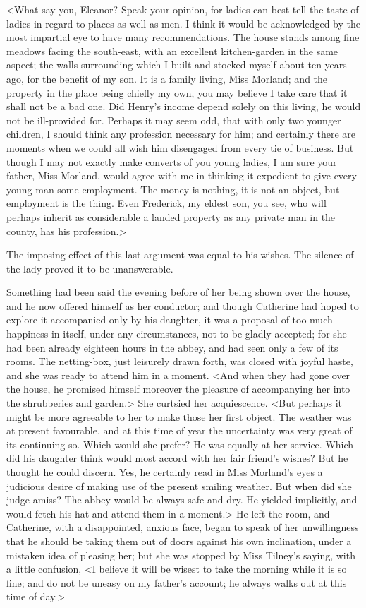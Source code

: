  <What say you, Eleanor? Speak your opinion, for ladies can best tell the taste of ladies in regard to places as well as men. I think it would be acknowledged by the most impartial eye to have many recommendations. The house stands among fine meadows facing the south-east, with an excellent kitchen-garden in the same aspect; the walls surrounding which I built and stocked myself about ten years ago, for the benefit of my son. It is a family living, Miss Morland; and the property in the place being chiefly my own, you may believe I take care that it shall not be a bad one. Did Henry's income depend solely on this living, he would not be ill-provided for. Perhaps it may seem odd, that with only two younger children, I should think any profession necessary for him; and certainly there are moments when we could all wish him disengaged from every tie of business. But though I may not exactly make converts of you young ladies, I am sure your father, Miss Morland, would agree with me in thinking it expedient to give every young man some employment. The money is nothing, it is not an object, but employment is the thing. Even Frederick, my eldest son, you see, who will perhaps inherit as considerable a landed property as any private man in the county, has his profession.> 

 The imposing effect of this last argument was equal to his wishes. The silence of the lady proved it to be unanswerable. 

 Something had been said the evening before of her being shown over the house, and he now offered himself as her conductor; and though Catherine had hoped to explore it accompanied only by his daughter, it was a proposal of too much happiness in itself, under any circumstances, not to be gladly accepted; for she had been already eighteen hours in the abbey, and had seen only a few of its rooms. The netting-box, just leisurely drawn forth, was closed with joyful haste, and she was ready to attend him in a moment. <And when they had gone over the house, he promised himself moreover the pleasure of accompanying her into the shrubberies and garden.> She curtsied her acquiescence. <But perhaps it might be more agreeable to her to make those her first object. The weather was at present favourable, and at this time of year the uncertainty was very great of its continuing so. Which would she prefer? He was equally at her service. Which did his daughter think would most accord with her fair friend's wishes? But he thought he could discern. Yes, he certainly read in Miss Morland's eyes a judicious desire of making use of the present smiling weather. But when did she judge amiss? The abbey would be always safe and dry. He yielded implicitly, and would fetch his hat and attend them in a moment.> He left the room, and Catherine, with a disappointed, anxious face, began to speak of her unwillingness that he should be taking them out of doors against his own inclination, under a mistaken idea of pleasing her; but she was stopped by Miss Tilney's saying, with a little confusion, <I believe it will be wisest to take the morning while it is so fine; and do not be uneasy on my father's account; he always walks out at this time of day.> 

